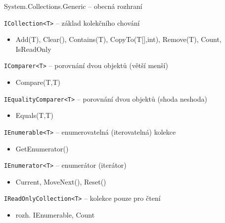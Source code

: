 \begin{frame}[fragile]
\begin{bitemize}{System.Collections.Generic -- obecná rozhraní}
\item \lstinline|ICollection<T>| -- základ kolekčního chování
\begin{itemize}
\item \footnotesize Add(T), Clear(), Contains(T), CopyTo(T[],int), Remove(T), Count, IsReadOnly
\end{itemize}

\item \lstinline|IComparer<T>| -- porovnání dvou objektů (větší menší)
\begin{itemize}
\item \footnotesize Compare(T,T)
\end{itemize}

\item \lstinline|IEqualityComparer<T>| -- porovnání dvou objektů (shoda neshoda)
\begin{itemize}
\item \footnotesize Equals(T,T)
\end{itemize}

\item \lstinline|IEnumerable<T>| -- enumerovatelná (iterovatelná) kolekce
\begin{itemize}
\item \footnotesize GetEnumerator()
\end{itemize}

\item \lstinline|IEnumerator<T>| -- enumerátor (iterátor)
\begin{itemize}
\item \footnotesize Current, MoveNext(), Reset()
\end{itemize}

\item \lstinline|IReadOnlyCollection<T>| -- kolekce pouze pro čtení
\begin{itemize}
\item \footnotesize rozh. IEnumerable, Count
\end{itemize}

\end{bitemize}
\end{frame}



